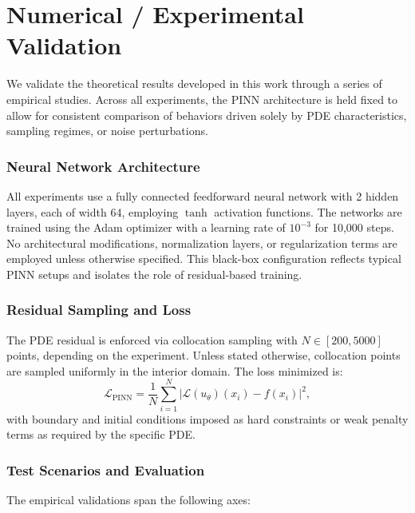 \documentclass[11pt, a4paper]{article}
\begin{document}
\section{Numerical / Experimental Validation}
We validate the theoretical results developed in this work through a series of empirical studies. Across all experiments, the PINN architecture is held fixed to allow for consistent comparison of behaviors driven solely by PDE characteristics, sampling regimes, or noise perturbations.

\subsubsection*{Neural Network Architecture}
All experiments use a fully connected feedforward neural network with 2 hidden layers, each of width 64, employing $\tanh$ activation functions. The networks are trained using the Adam optimizer with a learning rate of $10^{-3}$ for 10,000 steps. No architectural modifications, normalization layers, or regularization terms are employed unless otherwise specified. This black-box configuration reflects typical PINN setups and isolates the role of residual-based training.

\subsubsection*{Residual Sampling and Loss}
The PDE residual is enforced via collocation sampling with $N \in [200, 5000]$ points, depending on the experiment. Unless stated otherwise, collocation points are sampled uniformly in the interior domain. The loss minimized is:
\[
\mathcal{L}_{\text{PINN}} = \frac{1}{N} \sum_{i=1}^{N} \left| \mathcal{L}(u_\theta)(x_i) - f(x_i) \right|^2,
\]
with boundary and initial conditions imposed as hard constraints or weak penalty terms as required by the specific PDE.

\subsubsection*{Test Scenarios and Evaluation}
The empirical validations span the following axes:
\end{document}
